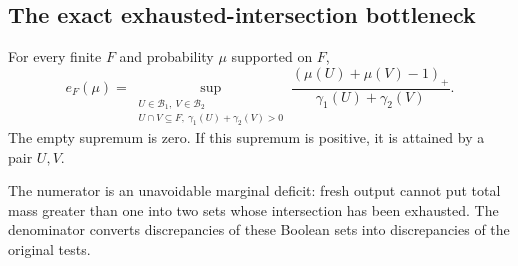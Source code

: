 \subsection{The exact exhausted-intersection bottleneck}
\begin{theorem}\label{ov:bottleneck}
For every finite $F$ and probability $\mu$ supported on $F$,
\begin{equation}\label{ov:exact}
 e_F(\mu)=
 \sup_{\substack{U\in\mathcal B_1,\ V\in\mathcal B_2\\
 U\cap V\subseteq F,\ \gamma_1(U)+\gamma_2(V)>0}}
 \frac{(\mu(U)+\mu(V)-1)_+}{\gamma_1(U)+\gamma_2(V)}.
\end{equation}
The empty supremum is zero. If this supremum is positive, it is attained by a pair $U,V$.
\end{theorem}
The numerator is an unavoidable marginal deficit: fresh output cannot put total mass greater than one into two sets whose intersection has been exhausted. The denominator converts discrepancies of these Boolean sets into discrepancies of the original tests.

